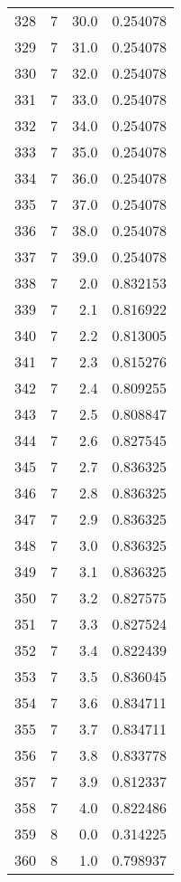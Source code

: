 \begin{tabular}{lrrr}
328 &        7 &     30.0 &  0.254078 \\
329 &        7 &     31.0 &  0.254078 \\
330 &        7 &     32.0 &  0.254078 \\
331 &        7 &     33.0 &  0.254078 \\
332 &        7 &     34.0 &  0.254078 \\
333 &        7 &     35.0 &  0.254078 \\
334 &        7 &     36.0 &  0.254078 \\
335 &        7 &     37.0 &  0.254078 \\
336 &        7 &     38.0 &  0.254078 \\
337 &        7 &     39.0 &  0.254078 \\
338 &        7 &      2.0 &  0.832153 \\
339 &        7 &      2.1 &  0.816922 \\
340 &        7 &      2.2 &  0.813005 \\
341 &        7 &      2.3 &  0.815276 \\
342 &        7 &      2.4 &  0.809255 \\
343 &        7 &      2.5 &  0.808847 \\
344 &        7 &      2.6 &  0.827545 \\
345 &        7 &      2.7 &  0.836325 \\
346 &        7 &      2.8 &  0.836325 \\
347 &        7 &      2.9 &  0.836325 \\
348 &        7 &      3.0 &  0.836325 \\
349 &        7 &      3.1 &  0.836325 \\
350 &        7 &      3.2 &  0.827575 \\
351 &        7 &      3.3 &  0.827524 \\
352 &        7 &      3.4 &  0.822439 \\
353 &        7 &      3.5 &  0.836045 \\
354 &        7 &      3.6 &  0.834711 \\
355 &        7 &      3.7 &  0.834711 \\
356 &        7 &      3.8 &  0.833778 \\
357 &        7 &      3.9 &  0.812337 \\
358 &        7 &      4.0 &  0.822486 \\
359 &        8 &      0.0 &  0.314225 \\
360 &        8 &      1.0 &  0.798937 \\

\end{tabular}
